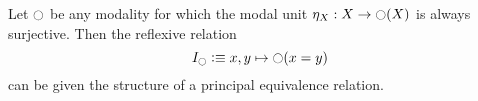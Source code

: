 \begin{comment}
\begin{defn}
Let $R:X\to X\to\UU$ be a reflexive binary relation on $X$. A \define{quotient approximation system} on $R$ consists of a \define{mediating type} $M$ fitting in a commuting triangle
\begin{equation*}
\begin{tikzcd}
X \arrow[rr,"R"] \arrow[dr,swap,"f"] & & \im(R) \\
& M \arrow[ur,swap,"g"]
\end{tikzcd}
\end{equation*}
and for every $S:Y\to M$ a homotopy
\begin{equation*}
H : \prd{x:X}{y:Y}{p:g(S(y),x)} f(x)= S(y).
\end{equation*}
\end{defn}

\begin{rmk}
The idea behind the definition of quotient approximation system is that any $S:Y\to M$ extends to the pushout as indicated in the diagram
\begin{equation*}
\begin{tikzcd}
\sm{x:X}{y:Y}g(S(y),x) \arrow[d,swap,"\pi_2"] \arrow[r,"\pi_1"] & X \arrow[d,swap,"\inl"] \arrow[ddr,bend left=15,"f"] \\ 
Y \arrow[r,swap,"\inr"] \arrow[drr,bend right=15,swap,"S"] & Y' \arrow[dr,swap,near start,densely dotted,"{S'}"] \\
& & M
\end{tikzcd}
\end{equation*}
The type $Y'$ is a slightly better approximation of the quotient $X/R$ than $Y$, and iterating this process shall lead us to the quotient.
\end{rmk}

\begin{eg}
If $R$ is a principal equivalence relation, then a quotient approximation system on $R$ can be defined with mediating type $X/R$. In \autoref{eg:idmodal} we will see a class of quotient approximation systems with mediating type $\im(R)$. 
\end{eg}
\end{comment}

\begin{defn}\label{eg:idmodal}
Let $\modal$ be any modality for which the modal unit $\modalunit[X]:X\to\modal(X)$ is always surjective. Then the reflexive relation 
\begin{equation*}
I_\modal \defeq x,y\mapsto\modal(x=y)
\end{equation*}
can be given the structure of a principal equivalence relation. 
\end{defn}

